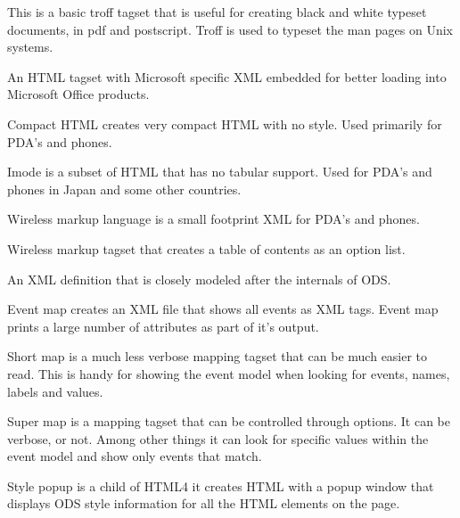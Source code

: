 \begin{description}

This is a basic troff tagset that is useful for creating black and
white typeset documents, in pdf and postscript.  Troff is used to
typeset the man pages on Unix systems.


An HTML tagset with Microsoft specific XML embedded for better
loading into Microsoft Office products.


Compact HTML creates very compact HTML with no style. 
Used primarily for PDA's and phones.


Imode is a subset of HTML that has no tabular support.
Used for PDA's and phones in Japan and some other countries.


Wireless markup language is a small footprint XML for
PDA's and phones.


Wireless markup tagset that creates a table of contents as
an option list.


An XML definition that is closely modeled after the internals of
ODS.


Event map creates an XML file that shows all events as XML tags.
Event map prints a large number of attributes as part of it's output.


Short map is a much less verbose mapping tagset that can be much easier
to read.  This is handy for showing the event model when looking for
events, names, labels and values.


Super map is a mapping tagset that can be controlled through options.
It can be verbose, or not.  Among other things it can look for 
specific values within the event model and show only events that match.



Style popup is a child of HTML4 it creates HTML with a popup window that displays
ODS style information for all the HTML elements on the page.



\end{description}
